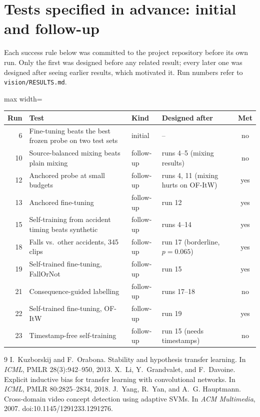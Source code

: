 \documentclass[10pt,twocolumn,letterpaper]{article}
\begin{document}
\section{Tests specified in advance: initial and follow-up}
Each success rule below was committed to the project repository before its own run. Only the first was designed before any related result; every later one was designed after seeing earlier results, which motivated it. Run numbers refer to \texttt{vision/RESULTS.md}.

\begin{table}[h]\centering\small
\begin{adjustbox}{max width=\linewidth}
\begin{tabular}{rlllc}\toprule
Run & Test & Kind & Designed after & Met\\\midrule
6 & Fine-tuning beats the best frozen probe on two test sets & initial & -- & no\\
10 & Source-balanced mixing beats plain mixing & follow-up & runs 4--5 (mixing results) & no\\
12 & Anchored probe at small budgets & follow-up & runs 4, 11 (mixing hurts on OF-ItW) & yes\\
13 & Anchored fine-tuning & follow-up & run 12 & yes\\
15 & Self-training from accident timing beats synthetic & follow-up & runs 4--14 & yes\\
18 & Falls vs.\ other accidents, 345 clips & follow-up & run 17 (borderline, $p=0.065$) & yes\\
19 & Self-trained fine-tuning, FallOrNot & follow-up & run 15 & yes\\
21 & Consequence-guided labelling & follow-up & runs 17--18 & no\\
22 & Self-trained fine-tuning, OF-ItW & follow-up & run 19 & yes\\
23 & Timestamp-free self-training & follow-up & run 15 (needs timestamps) & no\\\bottomrule
\end{tabular}
\end{adjustbox}
\end{table}

{\small
\begin{thebibliography}{9}
 I.~Kuzborskij and F.~Orabona. Stability and hypothesis transfer learning. In \emph{ICML}, PMLR 28(3):942--950, 2013.
 X.~Li, Y.~Grandvalet, and F.~Davoine. Explicit inductive bias for transfer learning with convolutional networks. In \emph{ICML}, PMLR 80:2825--2834, 2018.
 J.~Yang, R.~Yan, and A.~G. Hauptmann. Cross-domain video concept detection using adaptive SVMs. In \emph{ACM Multimedia}, 2007. doi:10.1145/1291233.1291276.
\end{thebibliography}
}
\end{document}
